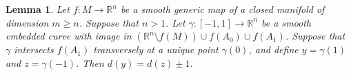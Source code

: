\documentclass[12pt]{amsart}
\def \R{\mathbb{R}}
\def\co{\colon}
\newtheorem{lemma}[theorem]{Lemma}
\theoremstyle{definition}
\begin{document}

 
 \begin{lemma}\label{l:tech} Let $f\co M\to \R^n$ be a smooth generic map of a closed manifold of dimension $m\ge n$. Suppose that $n>1$. Let $\gamma \co [-1,1]\to \R^n$  be a smooth embedded curve with image in $(\R^n\setminus f(M))\cup f(A_0)\cup f(A_1)$. Suppose that $\gamma$ intersects $f(A_1)$ transversely at a unique point $\gamma(0)$,  and define $y=\gamma(1)$ and $z= \gamma(-1)$.  Then $d(y) = d(z) \pm 1$.  
 \end{lemma} 
 
\end{document}
